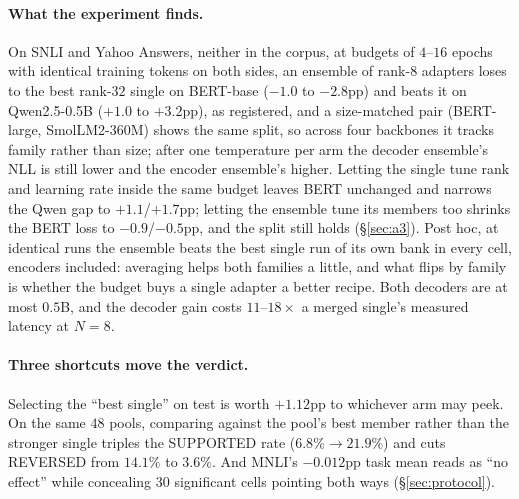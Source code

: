 \documentclass[11pt]{article}
\begin{document}
\paragraph{What the experiment finds.} On SNLI and Yahoo Answers, neither in the corpus, at budgets of $4$--$16$ epochs with identical training tokens on both sides, an ensemble of rank-$8$ adapters loses to the best rank-$32$ single on BERT-base ($-1.0$ to $-2.8$pp) and beats it on Qwen2.5-0.5B ($+1.0$ to $+3.2$pp), as registered, and a size-matched pair (BERT-large, SmolLM2-360M) shows the same split, so across four backbones it tracks family rather than size; after one temperature per arm the decoder ensemble's NLL is still lower and the encoder ensemble's higher. Letting the single tune rank and learning rate inside the same budget leaves BERT unchanged and narrows the Qwen gap to $+1.1$/$+1.7$pp; letting the ensemble tune its members too shrinks the BERT loss to $-0.9$/$-0.5$pp, and the split still holds (\S\ref{sec:a3}). Post hoc, at identical runs the ensemble beats the best single run of its own bank in every cell, encoders included: averaging helps both families a little, and what flips by family is whether the budget buys a single adapter a better recipe. Both decoders are at most $0.5$B, and the decoder gain costs $11$--$18\times$ a merged single's measured latency at $N{=}8$.

\paragraph{Three shortcuts move the verdict.} Selecting the ``best single'' on test is worth $+1.12$pp to whichever arm may peek. On the same $48$ pools, comparing against the pool's best member rather than the stronger single triples the SUPPORTED rate ($6.8\%\to21.9\%$) and cuts REVERSED from $14.1\%$ to $3.6\%$. And MNLI's $-0.012$pp task mean reads as ``no effect'' while concealing $30$ significant cells pointing both ways (\S\ref{sec:protocol}).
\end{document}
